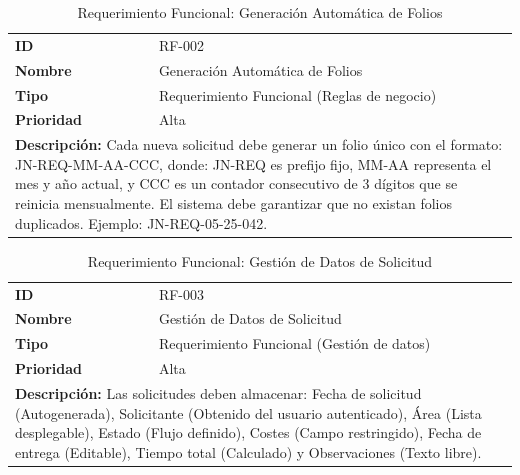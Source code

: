 \documentclass[12pt,letterpaper,spanish]{report}
\begin{document}
\begin{table}[H]
    \centering
    \caption{Requerimiento Funcional: Generación Automática de Folios}
    \label{tab:rf002}
    \begin{tabular}{ll}
        \toprule
        \textbf{ID} & RF-002 \\
        \textbf{Nombre} & Generación Automática de Folios \\
        \textbf{Tipo} & Requerimiento Funcional (Reglas de negocio) \\
        \textbf{Prioridad} & Alta \\
        \midrule
        \multicolumn{2}{l}{
            \parbox{0.9\linewidth}{
                \textbf{Descripción:} Cada nueva solicitud debe generar un folio único con el formato: JN-REQ-MM-AA-CCC, donde: JN-REQ es prefijo fijo, MM-AA representa el mes y año actual, y CCC es un contador consecutivo de 3 dígitos que se reinicia mensualmente. El sistema debe garantizar que no existan folios duplicados. Ejemplo: JN-REQ-05-25-042.
            }
        } \\
        \bottomrule
    \end{tabular}
\end{table}

\begin{table}[H]
    \centering
    \caption{Requerimiento Funcional: Gestión de Datos de Solicitud}
    \label{tab:rf003}
    \begin{tabular}{ll}
        \toprule
        \textbf{ID} & RF-003 \\
        \textbf{Nombre} & Gestión de Datos de Solicitud \\
        \textbf{Tipo} & Requerimiento Funcional (Gestión de datos) \\
        \textbf{Prioridad} & Alta \\
        \midrule
        \multicolumn{2}{l}{
            \parbox{0.9\linewidth}{
                \textbf{Descripción:} Las solicitudes deben almacenar: Fecha de solicitud (Autogenerada), Solicitante (Obtenido del usuario autenticado), Área (Lista desplegable), Estado (Flujo definido), Costes (Campo restringido), Fecha de entrega (Editable), Tiempo total (Calculado) y Observaciones (Texto libre).
            }
        } \\
        \bottomrule
    \end{tabular}
\end{table}
\end{document}
